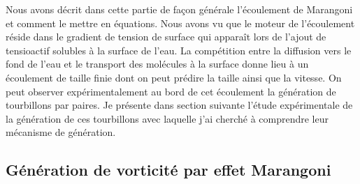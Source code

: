 \documentclass[french, 10pt]{article}
\begin{document}
Nous avons décrit dans cette partie de façon générale l'écoulement de Marangoni et comment le mettre en équations. Nous avons vu que le moteur de l'écoulement réside dans le gradient de tension de surface qui apparaît lors de l'ajout de tensioactif solubles à la surface de l'eau. La compétition entre la diffusion vers le fond de l'eau et le transport des molécules à la surface donne lieu  à un écoulement de taille finie dont on peut prédire la taille ainsi que la vitesse. On peut observer expérimentalement au bord de cet écoulement la génération de tourbillons par paires. Je présente dans section suivante l'étude expérimentale de la génération de ces tourbillons avec laquelle j'ai cherché à comprendre leur mécanisme de génération.

\subsection{Génération de vorticité par effet Marangoni}

\end{document}
